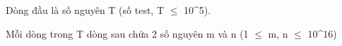 Dòng đầu là số nguyên T (số test, T  $\le$  10^5).

Mỗi dòng trong T dòng sau chứa 2 số nguyên m và n (1  $\le$  m, n  $\le$  10^16)